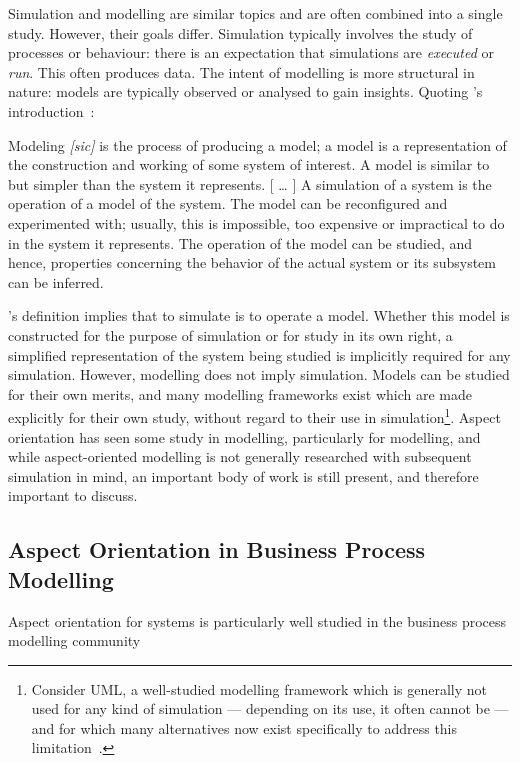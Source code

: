 Simulation and modelling are similar topics and are often combined into a single
study. However, their goals differ. Simulation typically involves the study of
processes or behaviour: there is an expectation that simulations are
\emph{executed} or \emph{run}. This often produces data. The intent of modelling
is more structural in nature: models are typically observed or analysed to gain
insights. Quoting \citeauthor{smintro}'s introduction~\cite{smintro}:

\begin{displayquote}
    Modeling \emph{[sic]} is the process of producing a model; a model
    is a representation of the construction and working of
    some system of interest. A model is similar to but
    simpler than the system it represents.
    \newline{}
    [ \ldots{} ]
    \newline{}
    A simulation of a system is the operation of a model of the system. The
    model can be reconfigured and experimented with; usually, this is
    impossible, too expensive or impractical to do in the system it represents.
    The operation of the model can be studied, and hence, properties concerning
    the behavior of the actual system or its subsystem can be inferred.
\end{displayquote}

\citeauthor{smintro}'s definition implies that to simulate is to operate a
model. Whether this model is constructed for the purpose of simulation or for
study in its own right, a simplified representation of the system being studied
is implicitly required for any simulation. However, modelling does not imply
simulation. Models can be studied for their own merits, and many modelling
frameworks exist which are made explicitly for their own study, without regard
to their use in simulation\footnote{Consider UML, a well-studied modelling
framework which is generally not used for any kind of simulation --- depending
on its use, it often cannot be --- and for which many alternatives now exist
specifically to address this
limitation~\cite{opm_original,ExecutableBPMNMitsyuk}.}. Aspect orientation has seen some study in modelling,
particularly for \sociotechnical modelling, and while aspect-oriented
\sociotechnical modelling is not generally researched with subsequent simulation
in mind, an important body of work is still present, and therefore important to
discuss.

\subsection{Aspect Orientation in Business Process Modelling}
Aspect orientation for \sociotechnical systems is particularly well studied in
the business process modelling
community\cite{Machado_2011,Cappelli_AOBPM}~


